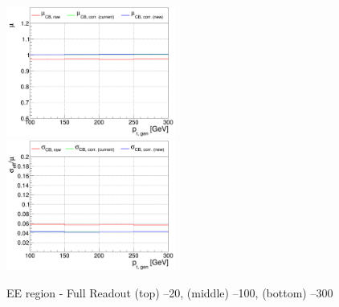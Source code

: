 \begin{figure}
\includegraphics[width=0.495\textwidth]{./plots_pdf/ECAL_plots/plotsNoPU/EE/pdf/FULL/GENPT/EEFULL_GENPT_0100_0300_MuOverBins.pdf}
\includegraphics[width=0.495\textwidth]{./plots_pdf/ECAL_plots/plotsNoPU/EE/pdf/FULL/GENPT/EEFULL_GENPT_0100_0300_EffSigmaOverBins.pdf}

\caption{EE region - Full Readout (top) --20\GeV , (middle) --100\GeV, (bottom) --300\GeV}
\label{fig:NOPU_EEFULL_pt}
\end{figure}



